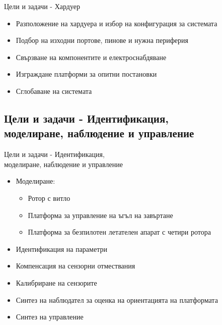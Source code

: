 \documentclass{beamer}
\begin{document}
\begin{frame}{Цели и задачи - Хардуер}
	\begin{itemize}
		\pause 
		\item Разположение на хардуера и избор на конфигурация за системата 

		\pause 
		\item Подбор на изходни портове, пинове и нужна периферия

		\pause
		\item Свързване на компонентите и електроснабдяване

		\pause 
		\item Изграждане платформи за опитни постановки

		\pause 
		\item Сглобаване на системата

	\end{itemize}
\end{frame}

\subsection{Цели и задачи - Идентификация,\\ моделиране, наблюдение и управление}


\begin{frame}{Цели и задачи -  Идентификация,\\ моделиране, наблюдение и управление }
	\begin{itemize}
		\pause 
		\item Моделиране:

		\begin{itemize}
			\pause 
			\item Ротор с витло

			\pause 
			\item Платформа за управление на ъгъл на завъртане

			\pause 
			\item Платформа за безпилотен летателен апарат с четири ротора

		\end{itemize}
		\pause 
		\item Идентификация на параметри

		\pause 
		\item Компенсация на сензорни отмествания

		\pause
		\item Калибриране на сензорите

		\pause
		\item Синтез на наблюдател за оценка на ориентацията на платформата

		\pause 
		\item Синтез на управление
	\end{itemize}
\end{frame}
\end{document}
